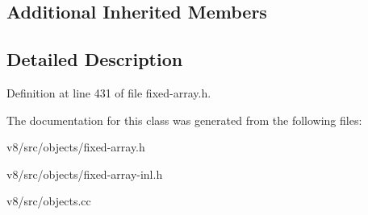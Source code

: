 \subsection*{Additional Inherited Members}


\subsection{Detailed Description}


Definition at line 431 of file fixed-\/array.\+h.



The documentation for this class was generated from the following files\+:\begin{DoxyCompactItemize}
\item 
v8/src/objects/fixed-\/array.\+h\item 
v8/src/objects/fixed-\/array-\/inl.\+h\item 
v8/src/objects.\+cc\end{DoxyCompactItemize}
